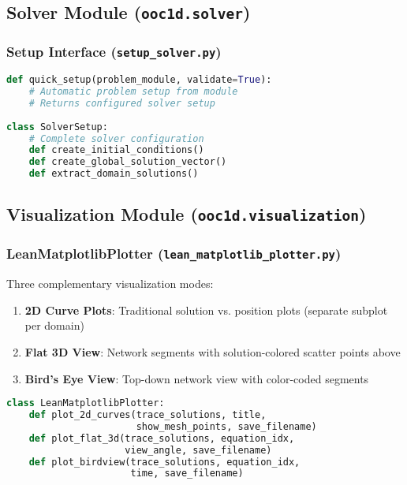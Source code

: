 \documentclass[11pt,a4paper]{article}
\newcommand{\code}[1]{\texttt{#1}}
\begin{document}
\subsection{Solver Module (\code{ooc1d.solver})}

\subsubsection{Setup Interface (\code{setup\_solver.py})}

\begin{lstlisting}[language=Python, caption={Setup Interface}]
def quick_setup(problem_module, validate=True):
    # Automatic problem setup from module
    # Returns configured solver setup
    
class SolverSetup:
    # Complete solver configuration
    def create_initial_conditions()
    def create_global_solution_vector()
    def extract_domain_solutions()
\end{lstlisting}

\subsection{Visualization Module (\code{ooc1d.visualization})}

\subsubsection{LeanMatplotlibPlotter (\code{lean\_matplotlib\_plotter.py})}

Three complementary visualization modes:

\begin{enumerate}
    \item \textbf{2D Curve Plots}: Traditional solution vs. position plots (separate subplot per domain)
    \item \textbf{Flat 3D View}: Network segments with solution-colored scatter points above
    \item \textbf{Bird's Eye View}: Top-down network view with color-coded segments
\end{enumerate}

\begin{lstlisting}[language=Python, caption={Visualization Methods}]
class LeanMatplotlibPlotter:
    def plot_2d_curves(trace_solutions, title, 
                       show_mesh_points, save_filename)
    def plot_flat_3d(trace_solutions, equation_idx, 
                     view_angle, save_filename)
    def plot_birdview(trace_solutions, equation_idx, 
                      time, save_filename)
\end{lstlisting}
\end{document}
